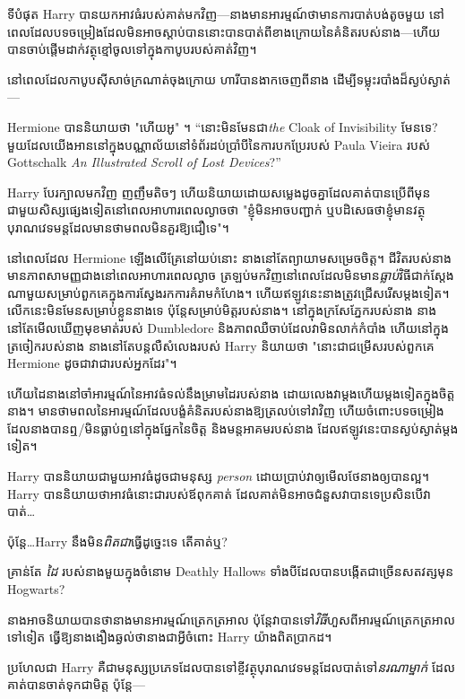 {{{ទីបំផុត Harry បានយកអាវធំរបស់គាត់មកវិញ—នាងមានអារម្មណ៍ថាមានការបាត់បង់តូចមួយ នៅពេលដែលបទចម្រៀងដែលមិនអាចស្តាប់បាននោះបានបាត់ពីខាងក្រោយនៃគំនិតរបស់នាង—ហើយបានចាប់ផ្តើមដាក់វត្ថុខ្មៅចូលទៅក្នុងកាបូបរបស់គាត់វិញ។

នៅពេលដែលកាបូបស៊ីសាច់ក្រណាត់ចុងក្រោយ ហារីបានងាកចេញពីនាង ដើម្បីទម្លុះរបាំងដ៏ស្ងប់ស្ងាត់—

Hermione បាននិយាយថា "ហើយអូ" ។ “នោះមិនមែនជា\emph{the} Cloak of Invisibility មែនទេ? មួយដែលយើងអាននៅក្នុងបណ្ណាល័យនៅទំព័រដប់ប្រាំបីនៃការបកប្រែរបស់ Paula Vieira របស់ Gottschalk \emph{An Illustrated Scroll of Lost Devices}?”

Harry បែរក្បាលមកវិញ ញញឹមតិចៗ ហើយនិយាយដោយសម្លេងដូចគ្នាដែលគាត់បានប្រើពីមុនជាមួយសិស្សផ្សេងទៀតនៅពេលអាហារពេលល្ងាចថា "ខ្ញុំមិនអាចបញ្ជាក់ ឬបដិសេធថាខ្ញុំមានវត្ថុបុរាណវេទមន្តដែលមានថាមពលមិនគួរឱ្យជឿទេ"។

\later

នៅពេលដែល Hermione ឡើងលើគ្រែនៅយប់នោះ នាងនៅតែព្យាយាមសម្រេចចិត្ត។ ជីវិតរបស់នាងមានភាពសាមញ្ញជាងនៅពេលអាហារពេលល្ងាច ត្រឡប់មកវិញនៅពេលដែលមិនមាន\emph{ធ្លាប់}វិធីជាក់ស្តែងណាមួយសម្រាប់ពួកគេក្នុងការស្វែងរកការគំរាមកំហែង។ ហើយឥឡូវនេះនាងត្រូវជ្រើសរើសម្តងទៀត។ លើកនេះមិនមែនសម្រាប់ខ្លួននាងទេ ប៉ុន្តែសម្រាប់មិត្តរបស់នាង។ នៅក្នុងក្រសែភ្នែករបស់នាង នាងនៅតែមើលឃើញមុខមាត់របស់ Dumbledore និងភាពឈឺចាប់ដែលវាមិនលាក់កំបាំង ហើយនៅក្នុងត្រចៀករបស់នាង នាងនៅតែបន្តលឺសំលេងរបស់ Harry និយាយថា "នោះជាជម្រើសរបស់ពួកគេ Hermione ដូចជាវាជារបស់អ្នកដែរ"។

ហើយ​ដៃ​នាង​នៅ​ចាំ​អារម្មណ៍​នៃ​អាវ​ធំ​ទល់​នឹង​ម្រាម​ដៃ​របស់​នាង ដោយ​លេង​វា​ម្តង​ហើយ​ម្តង​ទៀត​ក្នុង​ចិត្ត​នាង។ មានថាមពលនៃអារម្មណ៍ដែលបង្ខំគំនិតរបស់នាងឱ្យត្រលប់ទៅវាវិញ ហើយចំពោះបទចម្រៀងដែលនាងបានឮ/មិនធ្លាប់ឮនៅក្នុងផ្នែកនៃចិត្ត និងមន្តអាគមរបស់នាង ដែលឥឡូវនេះបានស្ងប់ស្ងាត់ម្តងទៀត។

Harry បាន​និយាយ​ជាមួយ​អាវ​ធំ​ដូច​ជា​មនុស្ស \emph{person} ដោយ​ប្រាប់​វា​ឲ្យ​មើល​ថែ​នាង​ឲ្យ​បាន​ល្អ។ Harry បាននិយាយថាអាវធំនោះជារបស់ឪពុកគាត់ ដែលគាត់មិនអាចជំនួសវាបានទេប្រសិនបើវាបាត់…

ប៉ុន្តែ…Harry នឹងមិន\emph{ពិតជា}ធ្វើដូច្នេះទេ តើគាត់ឬ?

គ្រាន់តែ \emph{ដៃ} របស់នាងមួយក្នុងចំនោម Deathly Hallows ទាំងបីដែលបានបង្កើតជាច្រើនសតវត្សមុន Hogwarts?

នាង​អាច​និយាយ​បាន​ថា​នាង​មាន​អារម្មណ៍​ត្រេកត្រអាល ប៉ុន្តែ​វា​បាន​ទៅ​\emph{វិធី​} ហួស​ពី​អារម្មណ៍​ត្រេកត្រអាល​ទៅ​ទៀត ធ្វើ​ឱ្យ​នាង​ងឿង​ឆ្ងល់​ថា​នាង​ជា​អ្វី​ចំពោះ Harry យ៉ាង​ពិត​ប្រាកដ។

ប្រហែលជា Harry គឺជាមនុស្សប្រភេទដែលបានទៅខ្ចីវត្ថុបុរាណវេទមន្តដែលបាត់ទៅ\emph{នរណាម្នាក់} ដែលគាត់បានចាត់ទុកជាមិត្ត ប៉ុន្តែ—

}}}
